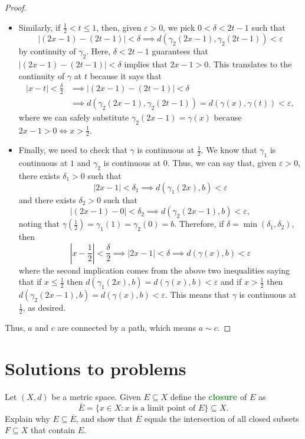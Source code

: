 \documentclass[11pt]{scrartcl}
\providecommand{\ol}{\overline}
\providecommand{\eps}{\varepsilon}
\providecommand{\half}{\frac{1}{2}}
\providecommand{\ii}{\item}
\providecommand{\vocab}[1]{{\textbf{\textcolor{ForestGreen}{#1}}}}
\providecommand{\abs}[1]{\left|#1\right|}
\begin{document}
\begin{proof}
\begin{itemize}
		\ii Similarly, if $\half < t \le 1$, then, given $\eps > 0$,
		we pick $0 < \delta < 2t - 1$ such that
		\[|(2x - 1) - (2t - 1)| < \delta \implies
		d(\gamma_2(2x-1), \gamma_2(2t-1)) < \eps\]
		by continuity of $\gamma_2$. Here, $\delta < 2t-1$ guarantees that
		$|(2x-1) - (2t-1)| < \delta$ implies that $2x-1 > 0$.
		This translates to the continuity of $\gamma$ at $t$ because
		it says that
		\begin{align*}
			|x - t| < \frac{\delta}{2} &\implies
			|(2x-1) - (2t-1)| < \delta\\
			&\implies
			d(\gamma_2(2x-1), \gamma_2(2t-1)) =
			d(\gamma(x),\gamma(t)) < \eps,
		\end{align*}
		where we can safely substitute $\gamma_2(2x-1) = \gamma(x)$
		because $2x-1 > 0\iff x > \half$.
		
		\ii Finally, we need to check that $\gamma$ is continuous
		at $\half$. We know that $\gamma_1$ is continuous at $1$
		and $\gamma_2$ is continuous at $0$. Thus, we can say that,
		given $\eps > 0$, there exists $\delta_1 > 0$ such that
		\[|2x - 1| < \delta_1 \implies d(\gamma_1(2x), b) < \eps\]
		and there exists $\delta_2 > 0$ such that
		\[|(2x-1) - 0| < \delta_2 \implies d(\gamma_2(2x-1), b) < \eps,\]
		noting that $\gamma(\half) = \gamma_1(1) = \gamma_2(0) = b$.
		Therefore, if $\delta = \min(\delta_1, \delta_2)$, then
		\[\abs{x-\half} < \frac\delta2 \implies
		\abs{2x-1} < \delta \implies d(\gamma(x), b) < \eps\]
		where the second implication comes from
		the above two inequalities saying that
		if $x \le\half$ then
		$d(\gamma_1(2x), b) = d(\gamma(x),b)<\eps$
		and if $x > \half$ then
		$d(\gamma_2(2x-1),b) = d(\gamma(x),b)<\eps$.
		This means that $\gamma$ is continuous at $\half$, as desired.
	\end{itemize}
	Thus, $a$ and $c$ are connected by a path, which means $a\sim c$.
\end{proof}

\pagebreak
\section{Solutions to problems}

\begin{problem}
	Let $(X, d)$ be a metric space. Given $E\subseteq X$
	define the \vocab{closure} of $E$ as
	\[\ol E = \{x\in X : x\text{ is a limit point of $E$}\}\subseteq X.\]
	Explain why $E\subseteq \ol E$, and show that $\ol E$ equals
	the intersection of all closed subsets $F\subseteq X$
	that contain $E$.
\end{problem}
\end{document}
